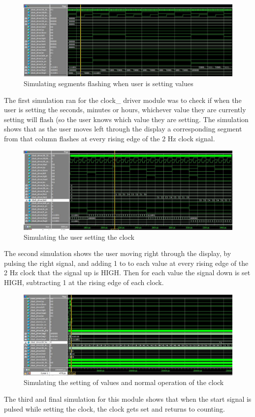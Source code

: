 \documentclass[a4paper]{article}
\begin{document}
\begin{figure}[H]
    \includegraphics[width=0.8 \linewidth]{images/clockdriversim1.JPG}
    \caption{Simulating segments flashing when user is setting values}
    \label{clockdriversim1}
\end{figure}
The first simulation ran for the clock\_ driver module was to check if when the user is setting the seconds, minutes or hours, whichever value they are currently setting will flash (so the user knows which value they are setting. The simulation shows that as the user moves left through the display a corresponding segment from that column flashes at every rising edge of the 2 Hz clock signal.

\begin{figure}[H]
    \includegraphics[width=0.8 \linewidth]{images/clockdriversim2.JPG}
    \caption{Simulating the user setting the clock}
    \label{clockdriversim2}
\end{figure}
The second simulation shows the user moving right through the display, by pulsing the right signal, and adding 1 to to each value at every rising edge of the 2 Hz clock that the signal up is HIGH. Then for each value the signal down is set HIGH, subtracting 1 at the rising edge of each clock.

\begin{figure}[H]
    \includegraphics[width=0.8 \linewidth]{images/clockdriversim3.JPG}
    \caption{Simulating the setting of values and normal operation of the clock}
    \label{clockdriversim3}
\end{figure}
The third and final simulation for this module shows that when the start signal is pulsed while setting the clock, the clock gets set and returns to counting.
\end{document}
